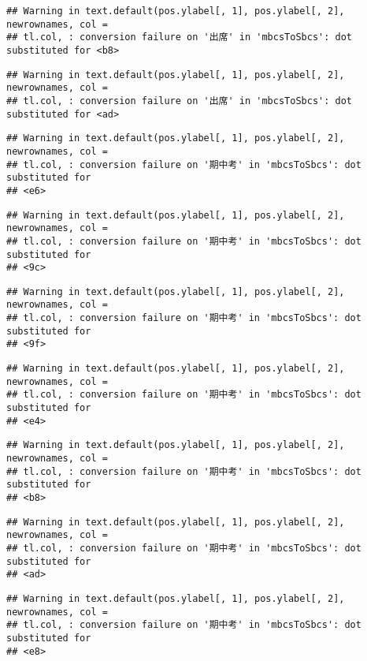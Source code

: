 \documentclass[
]{book}
\begin{document}
\begin{verbatim}
## Warning in text.default(pos.ylabel[, 1], pos.ylabel[, 2], newrownames, col =
## tl.col, : conversion failure on '出席' in 'mbcsToSbcs': dot substituted for <b8>
\end{verbatim}

\begin{verbatim}
## Warning in text.default(pos.ylabel[, 1], pos.ylabel[, 2], newrownames, col =
## tl.col, : conversion failure on '出席' in 'mbcsToSbcs': dot substituted for <ad>
\end{verbatim}

\begin{verbatim}
## Warning in text.default(pos.ylabel[, 1], pos.ylabel[, 2], newrownames, col =
## tl.col, : conversion failure on '期中考' in 'mbcsToSbcs': dot substituted for
## <e6>
\end{verbatim}

\begin{verbatim}
## Warning in text.default(pos.ylabel[, 1], pos.ylabel[, 2], newrownames, col =
## tl.col, : conversion failure on '期中考' in 'mbcsToSbcs': dot substituted for
## <9c>
\end{verbatim}

\begin{verbatim}
## Warning in text.default(pos.ylabel[, 1], pos.ylabel[, 2], newrownames, col =
## tl.col, : conversion failure on '期中考' in 'mbcsToSbcs': dot substituted for
## <9f>
\end{verbatim}

\begin{verbatim}
## Warning in text.default(pos.ylabel[, 1], pos.ylabel[, 2], newrownames, col =
## tl.col, : conversion failure on '期中考' in 'mbcsToSbcs': dot substituted for
## <e4>
\end{verbatim}

\begin{verbatim}
## Warning in text.default(pos.ylabel[, 1], pos.ylabel[, 2], newrownames, col =
## tl.col, : conversion failure on '期中考' in 'mbcsToSbcs': dot substituted for
## <b8>
\end{verbatim}

\begin{verbatim}
## Warning in text.default(pos.ylabel[, 1], pos.ylabel[, 2], newrownames, col =
## tl.col, : conversion failure on '期中考' in 'mbcsToSbcs': dot substituted for
## <ad>
\end{verbatim}

\begin{verbatim}
## Warning in text.default(pos.ylabel[, 1], pos.ylabel[, 2], newrownames, col =
## tl.col, : conversion failure on '期中考' in 'mbcsToSbcs': dot substituted for
## <e8>
\end{verbatim}
\end{document}
